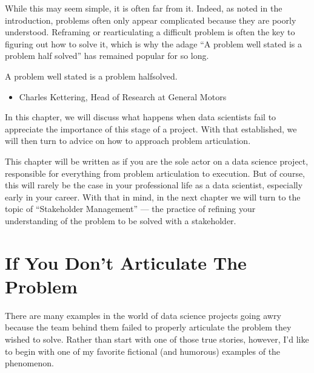 \documentclass[letterpaper,10pt,english]{jupyterBook}
\begin{document}
\sphinxAtStartPar
While this may seem simple, it is often far from it. Indeed, as noted in the introduction, problems often only appear complicated because they are poorly understood. Reframing or rearticulating a difficult problem is often the key to figuring out how to solve it, which is why the adage “A problem well stated is a problem half solved” has remained popular for so long.

\begin{sphinxShadowBox}

\sphinxAtStartPar
A problem well stated is a problem half\sphinxhyphen{}solved.
\begin{itemize}
\item {} 
\sphinxAtStartPar
Charles Kettering, Head of Research at General Motors

\end{itemize}
\end{sphinxShadowBox}

\sphinxAtStartPar
In this chapter, we will discuss what happens when data scientists fail to appreciate the importance of this stage of a project. With that established, we will then turn to advice on how to approach problem articulation.

\sphinxAtStartPar
This chapter will be written as if you are the sole actor on a data science project, responsible for everything from problem articulation to execution. But of course, this will rarely be the case in your professional life as a data scientist, especially early in your career. With that in mind, in the next chapter we will turn to the topic of “Stakeholder Management” — the practice of refining your understanding of the problem to be solved with a stakeholder.


\section{If You Don’t Articulate The Problem}
\label{\detokenize{20_problems_to_questions/10_solving_the_right_problem:if-you-don-t-articulate-the-problem}}
\sphinxAtStartPar
There are many examples in the world of data science projects going awry because the team behind them failed to properly articulate the problem they wished to solve. Rather than start with one of those true stories, however, I’d like to begin with one of my favorite fictional (and humorous) examples of the phenomenon.
\end{document}
